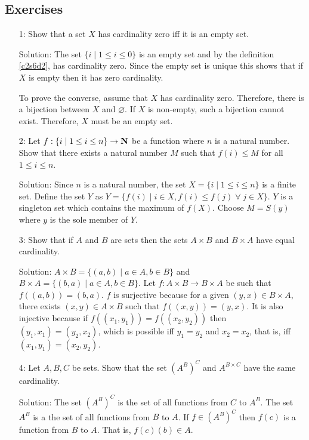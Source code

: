 \subsection{Exercises}
\begin{enumerate}
\item[1:] Show that a set $X$ has cardinality zero iff it is an empty set.
\item[Solution:] The set $\{i \;|\; 1 \le i \le 0\}$ is an empty set and
by the definition \ref{c2s6d2}, has cardinality zero. Since the empty set
is unique this shows that if $X$ is empty then it has zero cardinality.

To prove the converse, assume that $X$ has cardinality zero. Therefore, 
there is a bijection between $X$ and $\varnothing$. If $X$ is non-empty,
such a bijection cannot exist. Therefore, $X$ must be an empty set.

\item[2:] Let $f: \{i \;|\; 1 \le i \le n\} \rightarrow \mathbf{N}$ be a function
where $n$ is a natural number. Show that there exists a natural number $M$
such that $f(i) \le M$ for all $1 \le i \le n$.
\item[Solution:] Since $n$ is a natural number, the set $X = \{i \;|\; 1
\le i \le n\}$ is a finite set. Define the set $Y$ as $Y = \{f(i) \;|\;
i \in X, f(i) \le f(j) \;\forall\; j \in X\}$. $Y$ is a singleton set which
contains the maximum of $f(X)$. Choose $M = S(y)$ where $y$ is the sole
member of $Y$.

\item[3:] Show that if $A$ and $B$ are sets then the sets $A \times B$ and
$B \times A$ have equal cardinality.
\item[Solution:] $A \times B = \{(a, b) \;|\; a \in A, b \in B\}$ and $B
\times A = \{(b, a) \;|\; a \in A, b \in B\}$. Let $f: A \times B 
\rightarrow B \times A$ be such that $f((a, b)) = (b, a)$. $f$ is 
surjective because for a given $(y, x) \in B \times A$, there exists 
$(x, y) \in A \times B$ such that $f((x, y)) = (y, x)$. It is also 
injective because if $f((x_1, y_1)) = f((x_2, y_2))$ then $(y_1, x_1) = 
(y_2, x_2)$, which is possible iff $y_1 = y_2$ and $x_2 = x_2$, that is,
iff $(x_1, y_1) = (x_2, y_2)$.

\item[4:] Let $A, B, C$ be sets. Show that the set $(A^B)^C$ and $A^{B
\times C}$ have the same cardinality.
\item[Solution:] The set $(A^B)^C$ is the set of all functions from $C$ to
$A^B$. The set $A^B$ is a the set of all functions from $B$ to $A$. If 
$f \in (A^B)^C$ then $f(c)$ is a function from $B$ to $A$. That is, $f(c)
(b) \in A$.


\end{enumerate}
